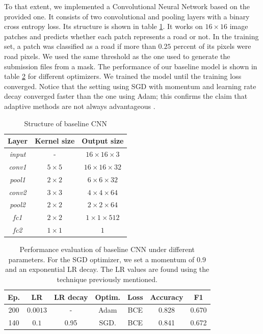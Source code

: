 \documentclass[10pt,conference,compsocconf]{IEEEtran}
\begin{document}
To that extent, we implemented a Convolutional Neural Network based on the provided one. It consists of two convolutional and pooling layers with a binary cross entropy loss. Its structure is shown in table \ref{tab:cnn_struct}. It works on $16 \times 16$ image patches and predicts whether each patch represents a road or not. In the training set, a patch was classified as a road if more than $0.25$ percent of its pixels were road pixels. We used the same threshold as the one used to generate the submission files from a mask. The performance of our baseline model is shown in table \ref{tab:cnn-perf} for different optimizers. We trained the model until the training loss converged. Notice that the setting using SGD with momentum and learning rate decay converged faster than the one using Adam; this confirms the claim that adaptive methods are not always advantageous \cite{wilson2018marginal}.

\begin{table}[ht]
    \centering
    \begin{tabular}{|c|c|c|}
        \hline
        Layer & Kernel size     & Output size  \\ \hline
        \textit{input} & -               & $16 \times 16 \times 3$\\ \hline
        \textit{conv1} & $5 \times 5$    & $16 \times 16 \times 32$ \\ \hline
        \textit{pool1} & $2 \times 2$    & $6 \times 6 \times 32 $\\ \hline
        \textit{conv2} & $3 \times 3$    & $ 4 \times 4 \times 64$ \\ \hline
        \textit{pool2} & $2 \times 2$    & $2 \times 2 \times 64$ \\ \hline
        \textit{fc1}   & $2 \times 2$    & $1 \times 1 \times 512$ \\ \hline
        \textit{fc2}   & $1 \times 1$    & $1$ \\ \hline
    \end{tabular}
    \caption{Structure of baseline CNN}
    \label{tab:cnn_struct}
\end{table}

\begin{table}[ht]
    \centering
    \begin{tabular}{|c|c|c|c|c|c|c|}
    \hline
        Ep.     & LR        & LR decay & Optim.     & Loss & Accuracy & F1      \\ \hline \hline
        200     & $0.0013$  & -        & Adam       & BCE  & 0.828   & 0.670   \\ \hline %
        140     & $0.1$     & 0.95     & SGD.       & BCE  & 0.841   & 0.672   \\ \hline %
        
    \end{tabular}
    \caption{Performance evaluation of baseline CNN under different parameters. For the SGD optimizer, we set a momentum of 0.9 and an exponential LR decay. The LR values are found using the technique previously mentioned.}
    \label{tab:cnn-perf}
\end{table}
\end{document}
